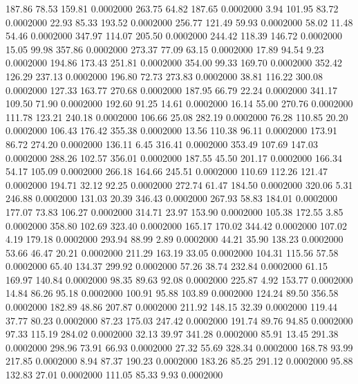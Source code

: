  187.86   78.53  159.81   0.0002000
 263.75   64.82  187.65   0.0002000
   3.94  101.95   83.72   0.0002000
  22.93   85.33  193.52   0.0002000
 256.77  121.49   59.93   0.0002000
  58.02   11.48   54.46   0.0002000
 347.97  114.07  205.50   0.0002000
 244.42  118.39  146.72   0.0002000
  15.05   99.98  357.86   0.0002000
 273.37   77.09   63.15   0.0002000
  17.89   94.54    9.23   0.0002000
 194.86  173.43  251.81   0.0002000
 354.00   99.33  169.70   0.0002000
 352.42  126.29  237.13   0.0002000
 196.80   72.73  273.83   0.0002000
  38.81  116.22  300.08   0.0002000
 127.33  163.77  270.68   0.0002000
 187.95   66.79   22.24   0.0002000
 341.17  109.50   71.90   0.0002000
 192.60   91.25   14.61   0.0002000
  16.14   55.00  270.76   0.0002000
 111.78  123.21  240.18   0.0002000
 106.66   25.08  282.19   0.0002000
  76.28  110.85   20.20   0.0002000
 106.43  176.42  355.38   0.0002000
  13.56  110.38   96.11   0.0002000
 173.91   86.72  274.20   0.0002000
 136.11    6.45  316.41   0.0002000
 353.49  107.69  147.03   0.0002000
 288.26  102.57  356.01   0.0002000
 187.55   45.50  201.17   0.0002000
 166.34   54.17  105.09   0.0002000
 266.18  164.66  245.51   0.0002000
 110.69  112.26  121.47   0.0002000
 194.71   32.12   92.25   0.0002000
 272.74   61.47  184.50   0.0002000
 320.06    5.31  246.88   0.0002000
 131.03   20.39  346.43   0.0002000
 267.93   58.83  184.01   0.0002000
 177.07   73.83  106.27   0.0002000
 314.71   23.97  153.90   0.0002000
 105.38  172.55    3.85   0.0002000
 358.80  102.69  323.40   0.0002000
 165.17  170.02  344.42   0.0002000
 107.02    4.19  179.18   0.0002000
 293.94   88.99    2.89   0.0002000
  44.21   35.90  138.23   0.0002000
  53.66   46.47   20.21   0.0002000
 211.29  163.19   33.05   0.0002000
 104.31  115.56   57.58   0.0002000
  65.40  134.37  299.92   0.0002000
  57.26   38.74  232.84   0.0002000
  61.15  169.97  140.84   0.0002000
  98.35   89.63   92.08   0.0002000
 225.87    4.92  153.77   0.0002000
  14.84   86.26   95.18   0.0002000
 100.91   95.88  103.89   0.0002000
 124.24   89.50  356.58   0.0002000
 182.89   48.86  207.87   0.0002000
 211.92  148.15   32.39   0.0002000
 119.44   37.77   80.23   0.0002000
  87.23  175.03  247.42   0.0002000
 191.74   89.76   94.85   0.0002000
  97.33  115.19  284.02   0.0002000
  32.13   39.97  341.28   0.0002000
  85.91   13.45  291.38   0.0002000
 298.96   73.91   66.93   0.0002000
  27.32   55.69  328.34   0.0002000
 168.78   93.99  217.85   0.0002000
   8.94   87.37  190.23   0.0002000
 183.26   85.25  291.12   0.0002000
  95.88  132.83   27.01   0.0002000
 111.05   85.33    9.93   0.0002000
